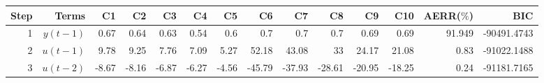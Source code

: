 \begin{tabular}{rrrrrrrrrrrrrr}
Step & Terms & C1 & C2 & C3 & C4 & C5 & C6 & C7 & C8 & C9 & C10 & AERR($\%$) & BIC \\ 
\hline 
1 & $y(t-1)$ & 0.67 & 0.64 & 0.63 & 0.54 & 0.6 & 0.7 & 0.7 & 0.7 & 0.69 & 0.69 & 91.949 & -90491.4743 \\ 
2 & $u(t-1)$ & 9.78 & 9.25 & 7.76 & 7.09 & 5.27 & 52.18 & 43.08 & 33 & 24.17 & 21.08 & 0.83 & -91022.1488 \\ 
3 & $u(t-2)$ & -8.67 & -8.16 & -6.87 & -6.27 & -4.56 & -45.79 & -37.93 & -28.61 & -20.95 & -18.25 & 0.24 & -91181.7165 \\ 
\hline 
\end{tabular}